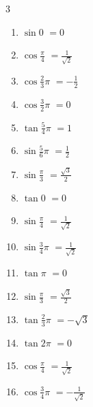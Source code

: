 \begin{multicols}{3}
\begin{enumerate}
  \item $\displaystyle \sin{0}$
        $\displaystyle =0$

  \item $\displaystyle \cos{\frac{\pi}{4}}$
        $\displaystyle =\frac{1}{\sqrt{2}}$

\columnbreak %

\resetques

  \item $\displaystyle \cos{\frac{2}{3}\pi}$
        $\displaystyle =-\frac{1}{2}$

  \item $\displaystyle \cos{\frac{3}{2}\pi}$
        $\displaystyle =0$

  \item $\displaystyle \tan{\frac{5}{4}\pi}$
        $\displaystyle =1$

  \item $\displaystyle \sin{\frac{5}{6}\pi}$
        $\displaystyle =\frac{1}{2}$

  \item $\displaystyle \sin{\frac{\pi}{3}}$
        $\displaystyle =\frac{\sqrt{3}}{2}$

  \item $\displaystyle \tan{0}$
        $\displaystyle =0$

  \item $\displaystyle \sin{\frac{\pi}{4}}$
        $\displaystyle =\frac{1}{\sqrt{2}}$

  \item $\displaystyle \sin{\frac{3}{4}\pi}$
        $\displaystyle =\frac{1}{\sqrt{2}}$

  \item $\displaystyle \tan{\pi}$
        $\displaystyle =0$

  \item $\displaystyle \sin{\frac{\pi}{3}}$
        $\displaystyle =\frac{\sqrt{3}}{2}$

  \item $\displaystyle \tan{\frac{2}{3}\pi}$
        $\displaystyle =-\sqrt{3}$

  \item $\displaystyle \tan{2\pi}$
        $\displaystyle =0$

  \item $\displaystyle \cos{\frac{\pi}{4}}$
        $\displaystyle =\frac{1}{\sqrt{2}}$

  \item $\displaystyle \cos{\frac{3}{4}\pi}$
        $\displaystyle =-\frac{1}{\sqrt{2}}$


\end{enumerate}
\end{multicols}
